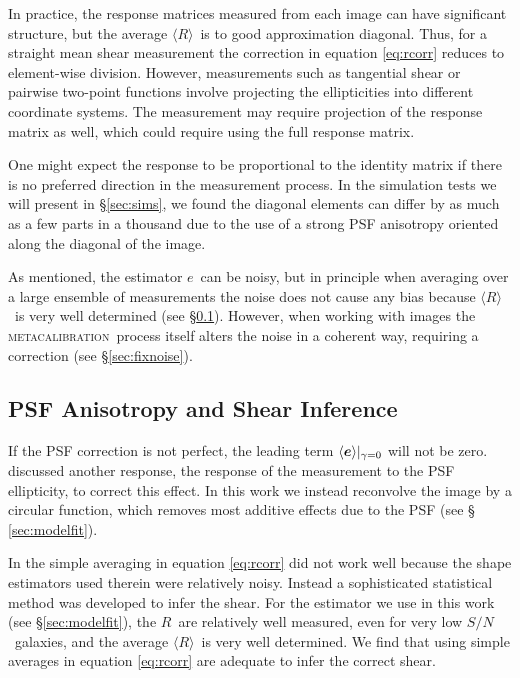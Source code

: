 \documentclass[iop]{emulateapj}
\newcommand{\snr}{$S/N$}
\newcommand{\vest}{\mbox{\boldmath $e$}}
\newcommand{\mcal}{\textsc{metacalibration}}
\newcommand{\mcalR}{\mbox{\boldmath $R$}}
\newcommand{\mcalRmean}{\mbox{\boldmath $\langle R \rangle$}}
\begin{document}
In practice, the response matrices measured from each image can have
significant structure, but the average \mcalRmean\ is to good approximation
diagonal.  Thus, for a straight mean shear measurement the correction in
equation \ref{eq:rcorr} reduces to element-wise division.  However,
measurements such as tangential shear or pairwise two-point functions involve
projecting the ellipticities into different coordinate systems. The measurement
may require projection of the response matrix as well, which could require
using the full response matrix.

One might expect the response to be proportional to the identity matrix if
there is no preferred direction in the measurement process.  In the simulation
tests we will present in \S \ref{sec:sims}, we found the diagonal elements can
differ by as much as a few parts in a thousand due to the use of a strong PSF
anisotropy oriented along the diagonal of the image.

As mentioned, the estimator \vest\ can be noisy, but in principle when
averaging over a large ensemble of measurements the noise does not cause any
bias because \mcalRmean\ is very well determined (see \S \ref{sec:differences}).
However, when working with images the \mcal\ process itself
alters the noise in a coherent way,
requiring a correction (see \S \ref{sec:fixnoise}).


\subsection{PSF Anisotropy and Shear Inference}  \label{sec:differences}

If the PSF correction is not perfect, the leading term $\langle \vest
\rangle|_{\gamma=0}$ will not be zero.  \cite{HuffMcal} discussed another
response, the response of the measurement to the PSF ellipticity, to correct
this effect.  In this work we instead reconvolve the image by a circular
function, which removes most additive effects due to the PSF  (see \S
\ref{sec:modelfit}).

In \cite{HuffMcal} the simple averaging in equation \ref{eq:rcorr} did not work
well because the shape estimators used  therein were relatively noisy.  Instead a sophisticated
statistical method was developed to infer the shear.  For the estimator we use
in this work (see \S \ref{sec:modelfit}), the \mcalR\ are relatively well
measured, even for very low \snr\ galaxies, and the average \mcalRmean\ is very
well determined. We find that using simple averages in equation \ref{eq:rcorr}
are adequate to infer the correct shear. 
\end{document}
